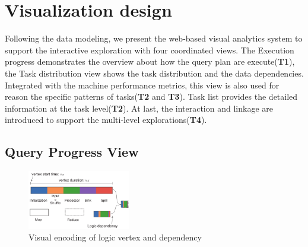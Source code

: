 
\section{Visualization design}
Following the data modeling, we present the web-based visual analytics system to support the interactive exploration with four coordinated views. The Execution progress demonstrates the overview about how the query plan are execute(\textbf{T1}), the Task distribution view shows the task distribution and the data dependencies. Integrated with the machine performance metrics, this view is also used for reason the specific patterns of tasks(\textbf{T2} and \textbf{T3}).  Task list provides the detailed information at the task level(\textbf{T2}).  At last, the interaction and linkage are introduced to support the multi-level explorations(\textbf{T4}).

\subsection{Query Progress View}\label{sec:queryprogress}


\begin{figure}[t]
	\centering
	\includegraphics[width=0.40\textwidth]{figures/visualization/progressdesign.pdf}
	\vspace{-3mm}
	\caption{Visual encoding of logic vertex and dependency}
	\label{fig:progress}
	\vspace{-3mm}
\end{figure}

